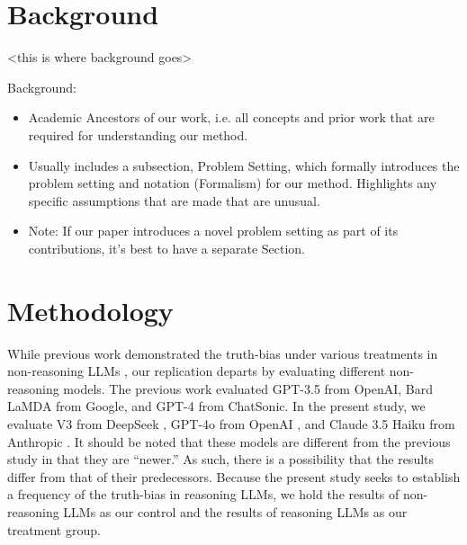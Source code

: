 \documentclass{article}
\begin{document}
\section{Background}

<this is where background goes>

Background:
\begin{itemize}
    \item Academic Ancestors of our work, i.e. all concepts and prior work that are required for understanding our method. 
    \item Usually includes a subsection, Problem Setting, which formally introduces the problem setting and notation (Formalism) for our method. Highlights any specific assumptions that are made that are unusual. 
    \item Note: If our paper introduces a novel problem setting as part of its contributions, it’s best to have a separate Section.
\end{itemize}


\section{Methodology}

While previous work demonstrated the truth-bias under various treatments in non-reasoning LLMs \citep{markowitz_generative_2024}, our replication departs by evaluating different non-reasoning models. The previous work evaluated GPT-3.5 from OpenAI, Bard LaMDA from Google, and GPT-4 from ChatSonic. In the present study, we evaluate V3 from DeepSeek \citep{deepseekai2025deepseekv3technicalreport}, GPT-4o from OpenAI \citep{openai2024gpt4ocard}, and Claude 3.5 Haiku from Anthropic \citep{anthropic_claude_2024}. It should be noted that these models are different from the previous study in that they are ``newer.'' As such, there is a possibility that the results differ from that of their predecessors. Because the present study seeks to establish a frequency of the truth-bias in reasoning LLMs, we hold the results of non-reasoning LLMs as our control and the results of reasoning LLMs as our treatment group.

\end{document}
